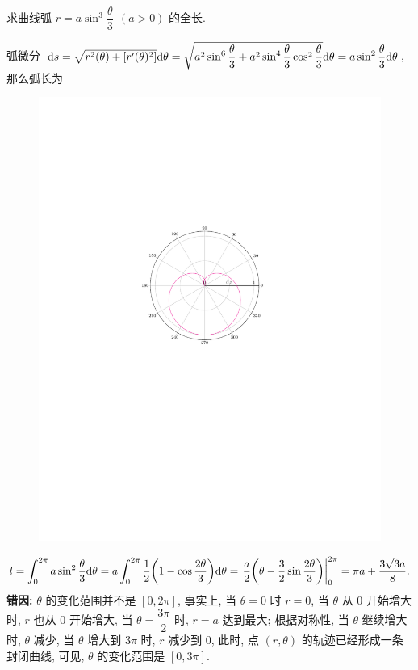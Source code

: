 \begin{example}
    求曲线弧 $r=a\sin^3\dfrac{\theta}{3}~~(a>0)$ 的全长.
\end{example}
\begin{errorSolution}
    弧微分 $\dd s=\sqrt{r^2(\theta)+\qty[r'(\theta)^2]}\dd \theta=\sqrt{a^2\sin^6\dfrac{\theta}{3}+a^2\sin^4\dfrac{\theta}{3}\cos^2\dfrac{\theta}{3}}\dd \theta=a\sin^2\dfrac{\theta}{3}\dd \theta$, 那么弧长为\\
    \begin{minipage}{0.24\linewidth}
        \begin{figure}[H]
            \centering
            \includegraphics[scale=0.4]{figures/sin3 3pi.pdf}
            \caption{}
        \end{figure}
    \end{minipage}\hfill
    \begin{minipage}{0.75\linewidth}
        $$l=\int_{0}^{2\pi}a\sin^2\dfrac{\theta}{3}\dd \theta=a\int_{0}^{2\pi}\dfrac{1}{2}\qty(1-\cos\dfrac{2\theta}{3})\dd \theta=\eval{\dfrac{a}{2}\qty(\theta-\dfrac{3}{2}\sin\dfrac{2\theta}{3})}_{0}^{2\pi}=\pi a+\dfrac{3\sqrt{3}a}{8}.$$
        \textbf{错因: }$\theta$ 的变化范围并不是 $[0,2\pi]$, 事实上, 当 $\theta=0$ 时 $r=0$, 当 $\theta$ 从 0 开始增大时, $r$ 也从 $0$ 开始增大, 当 $\theta=\dfrac{3\pi}{2}$ 时, $r=a$ 达到最大; 根据对称性, 当 $\theta$ 继续增大时,  $\theta$ 减少, 当 $\theta$ 增大到 $3\pi$ 时, $r$ 减少到 0, 此时, 点 $(r,\theta)$ 的轨迹已经形成一条封闭曲线, 可见, $\theta$ 的变化范围是 $[0,3\pi]$.
    \end{minipage}
\end{errorSolution}
